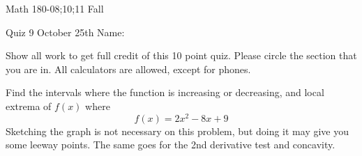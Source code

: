 \documentclass[11pt,epsfig]{article}
\begin{document}
Math 180-08;10;11 Fall

Quiz 9 October 25th \hspace{1.9in} {Name:} {\underline {\hspace{2.5in}}}
\vspace{2pc}

Show all work to get full credit of this 10 point quiz. Please circle the section that you are in. All calculators are allowed, except for phones.
\vspace{2pc}

\begin{problem}{10}
Find the intervals where the function is increasing or decreasing, and local extrema of $f(x)$ where 
\begin{equation*}
f(x) = 2x^2 - 8x + 9
\end{equation*}
Sketching the graph is not necessary on this problem, but doing it may give you some leeway points. The same goes for the 2nd derivative test and concavity.
\vfill
\end{problem}






\showpoints
\end{document}
